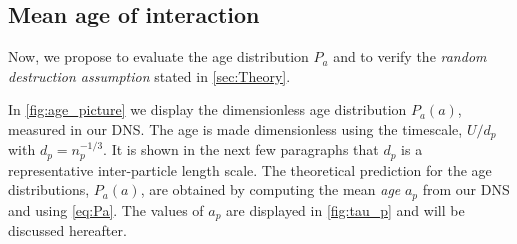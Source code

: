 
\subsection{Mean age of interaction}

Now, we propose to evaluate the age distribution $P_a$ and to verify the \textit{random destruction assumption} stated in \ref{sec:Theory}. 

In \ref{fig:age_picture} we display the dimensionless age distribution $P_a(a)$, measured in our DNS. 
The age is made dimensionless using the timescale, $U/d_p$ with $d_p = n_p^{-1/3}$.
It is shown in the next few paragraphs that $d_p$ is a representative inter-particle length scale. 
The theoretical prediction for the age distributions, $P_a(a)$, are obtained by computing the mean \textit{age} $a_p$ from our DNS and using \ref{eq:Pa}. 
The values of $a_p$ are displayed in \ref{fig:tau_p} and will be discussed hereafter. 

